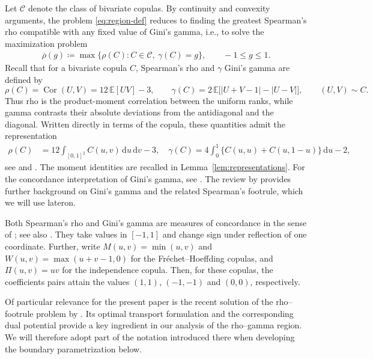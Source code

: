 \documentclass{article}
\theoremstyle{definition}
\theoremstyle{remark}
\newcommand{\1}{\mathds{1}}
\newcommand{\de}{\,\mathrm{d}}
\newcommand{\E}{\mathbb{E}}
\newcommand{\CC}{\mathcal{C}}
\newcommand{\I}{[0,1]}
\newcommand{\rhoup}{\overline{\rho}}
\begin{document}
Let $\CC$ denote the class of bivariate copulas. By continuity and convexity arguments, the problem \eqref{eq:region-def} reduces to finding the
greatest Spearman's rho compatible with any fixed value of Gini's
gamma, i.e., to solve the maximization problem 
\begin{align}\label{def_optim_problem}
    \rhoup(g)\coloneqq\max\{\rho(C):C\in\CC,\ \gamma(C)=g\},
    \qquad -1\le g\le1.
\end{align}
Recall that for a bivariate copula \(C\), Spearman's rho and \(\gamma\) Gini's gamma are defined by
\begin{equation}\label{eq:intro-rank-moments}
    \rho(C)=\operatorname{Cor}(U,V)=12\,\E[UV]-3,
    \qquad
    \gamma(C)=2\,\E\bigl[|U+V-1|-|U-V|\bigr], \qquad (U,V)\sim C.
\end{equation}
Thus rho is the product-moment correlation between the uniform ranks, while
gamma contrasts their absolute deviations from the antidiagonal and the
diagonal. Written directly in terms of the copula, these quantities admit the representation
\begin{equation}\label{eq:defs}
\begin{aligned}
    \rho(C)&=12\int_{\I^2}C(u,v)\de u\de v-3, \quad
    \gamma(C)=4\int_0^1\bigl\{C(u,u)+C(u,1-u)\bigr\}\de u-2,
\end{aligned}
\end{equation}
see \citet[Section~5.1]{nelsen2006introduction} and
\citet[Section~2]{bukovsek2021spearman}.
The moment identities are recalled in Lemma~\ref{lem:representations}.
For the concordance interpretation of Gini's gamma, see
\citet{nelsen1998concordance}. The review by
\citet{genest2010spearman} provides further background on Gini's gamma and the related
Spearman's footrule, which we will use lateron.

Both Spearman's rho and Gini's gamma are measures of concordance in the sense of
\citet{scarsini1984measures}; see also
\citet[Section~2.4]{durante2015principles}. They take values in $[-1,1]$
and change sign under reflection of one coordinate. Further, write
$M(u,v)=\min(u,v)$ and $W(u,v)=\max(u+v-1,0)$ for the
Fr\'echet--Hoeffding copulas, and $\Pi(u,v)=uv$ for the independence copula.
Then, for these copulas, the coefficients pairs attain the values $(1,1)$, $(-1,-1)$ and $(0,0)$, respectively.

Of particular relevance for the present paper is the recent
solution of the rho--footrule problem by \citet{ansari2026exact}. Its optimal transport formulation and the corresponding dual potential provide a key ingredient in our analysis of the rho--gamma region. We will therefore adopt part of the notation introduced there when developing the boundary parametrization below.
\end{document}
